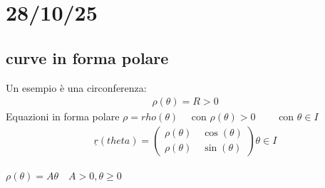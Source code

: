 \documentclass[a4paper, oneside]{article}
\begin{document}
\newpage
\section{28/10/25}
\subsection{curve in forma polare}
\begin{center}
\end{center}

Un esempio è una circonferenza:
\begin{gather*}
    \rho(\theta) = R>0
\end{gather*}
Equazioni in forma polare $\rho = rho(\theta) \quad$ con $\rho(\theta) > 0 \qquad $ con $\theta \in I$\\
\begin{gather*}
    \underline{r}(theta) = \begin{pmatrix}
        \rho(\theta) \quad \cos(\theta)\\
        \rho(\theta) \quad \sin(\theta)
    \end{pmatrix}\theta \in I
\end{gather*}
\begin{example}
    $\rho(\theta) = A\theta \quad A>0, \theta \geq 0$
    \begin{center}
    \end{center}
\end{example}
\end{document}
